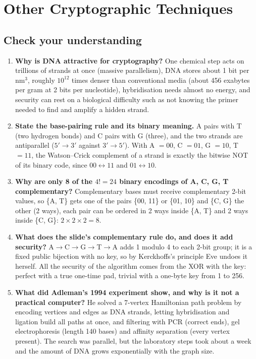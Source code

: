 \section{Other Cryptographic Techniques}\label{q:othertech}

\subsection*{Check your understanding}
\begin{enumerate}[leftmargin=1.6em,itemsep=3pt]
  \item \textbf{Why is DNA attractive for cryptography?} One chemical step acts on trillions of strands at once (massive parallelism), DNA stores about 1 bit per nm$^3$, roughly $10^{12}$ times denser than conventional media (about 456 exabytes per gram at 2 bits per nucleotide), hybridisation needs almost no energy, and security can rest on a biological difficulty such as not knowing the primer needed to find and amplify a hidden strand.
  \item \textbf{State the base-pairing rule and its binary meaning.} A pairs with T (two hydrogen bonds) and C pairs with G (three), and the two strands are antiparallel ($5'\to3'$ against $3'\to5'$). With A $= 00$, C $= 01$, G $= 10$, T $= 11$, the Watson--Crick complement of a strand is exactly the bitwise NOT of its binary code, since $00 \leftrightarrow 11$ and $01 \leftrightarrow 10$.
  \item \textbf{Why are only 8 of the $4! = 24$ binary encodings of A, C, G, T complementary?} Complementary bases must receive complementary 2-bit values, so \{A, T\} gets one of the pairs \{00, 11\} or \{01, 10\} and \{C, G\} the other (2 ways), each pair can be ordered in 2 ways inside \{A, T\} and 2 ways inside \{C, G\}: $2 \times 2 \times 2 = 8$.
  \item \textbf{What does the slide's complementary rule do, and does it add security?} A$\to$C$\to$G$\to$T$\to$A adds 1 modulo 4 to each 2-bit group; it is a fixed public bijection with no key, so by Kerckhoffs's principle Eve undoes it herself. All the security of the algorithm comes from the XOR with the key: perfect with a true one-time pad, trivial with a one-byte key from 1 to 256.
  \item \textbf{What did Adleman's 1994 experiment show, and why is it not a practical computer?} He solved a 7-vertex Hamiltonian path problem by encoding vertices and edges as DNA strands, letting hybridisation and ligation build all paths at once, and filtering with PCR (correct ends), gel electrophoresis (length 140 bases) and affinity separation (every vertex present). The search was parallel, but the laboratory steps took about a week and the amount of DNA grows exponentially with the graph size.

\end{enumerate}
